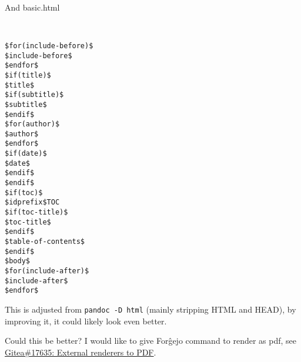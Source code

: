 \documentclass[a4paper,colorlinks,linkcolor=blue]{artikel3}
\begin{document}
And basic.html

\begin{verbatim}


$for(include-before)$
$include-before$
$endfor$
$if(title)$
$title$
$if(subtitle)$
$subtitle$
$endif$
$for(author)$
$author$
$endfor$
$if(date)$
$date$
$endif$
$endif$
$if(toc)$
$idprefix$TOC
$if(toc-title)$
$toc-title$
$endif$
$table-of-contents$
$endif$
$body$
$for(include-after)$
$include-after$
$endfor$
\end{verbatim}

This is adjusted from \texttt{pandoc -D html} (mainly stripping HTML and HEAD), by improving it, it could likely look even better.

Could this be better?
I would like to give For\^gejo command to render as pdf, see
\href{https://github.com/go-gitea/gitea/issues/17635}{Gitea\#17635: External renderers to PDF}.
\end{document}
